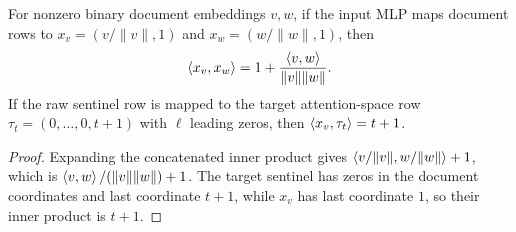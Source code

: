 \begin{lemma}
  \label{lem:normalized-document-inner-cosine}
  For nonzero binary document embeddings $v,w$, if the input MLP maps document
  rows to $x_v=(v/\|v\|,1)$ and $x_w=(w/\|w\|,1)$, then
  \[
    \left\langle x_v,x_w\right\rangle=1+\frac{\left\langle v,w\right\rangle}{\|v\|\|w\|}.
  \]
  If the raw sentinel row is mapped to the target attention-space row
  $\tau_t=(0,\ldots,0,t+1)$ with $\ell$ leading zeros, then
  $\left\langle x_v,\tau_t\right\rangle=t+1$.
\end{lemma}
\begin{proof}
  Expanding the concatenated inner product gives
  $\left\langle v/\|v\|,w/\|w\|\right\rangle+1$, which is
  $\left\langle v,w\right\rangle/(\|v\|\|w\|)+1$.  The target sentinel has zeros in the document
  coordinates and last coordinate $t+1$, while $x_v$ has last coordinate $1$,
  so their inner product is $t+1$.
\end{proof}

